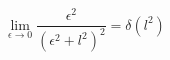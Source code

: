 \begin{equation}
\lim_{\epsilon\to 0}\frac{\epsilon^2}{(\epsilon^2+l^2)^2}=\delta(l^2)
\label{implimit}
\end{equation}

